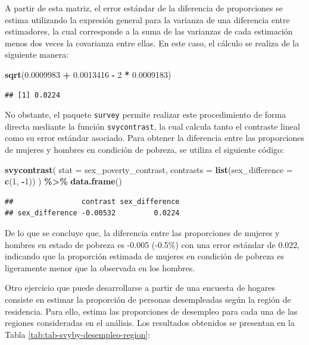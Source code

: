 \documentclass[
  spanish,
  12pt,
]{book}
\newenvironment{Shaded}{\begin{snugshade}}{\end{snugshade}}
\newcommand{\AttributeTok}[1]{\textcolor[rgb]{0.13,0.29,0.53}{#1}}
\newcommand{\DecValTok}[1]{\textcolor[rgb]{0.00,0.00,0.81}{#1}}
\newcommand{\FloatTok}[1]{\textcolor[rgb]{0.00,0.00,0.81}{#1}}
\newcommand{\FunctionTok}[1]{\textcolor[rgb]{0.13,0.29,0.53}{\textbf{#1}}}
\newcommand{\NormalTok}[1]{#1}
\newcommand{\SpecialCharTok}[1]{\textcolor[rgb]{0.81,0.36,0.00}{\textbf{#1}}}
\begin{document}
A partir de esta matriz, el error estándar de la diferencia de proporciones se estima utilizando la expresión general para la varianza de una diferencia entre estimadores, la cual corresponde a la suma de las varianzas de cada estimación menos dos veces la covarianza entre ellas. En este caso, el cálculo se realiza de la siguiente manera:

\begin{Shaded}
\begin{Highlighting}[]
\FunctionTok{sqrt}\NormalTok{(}\FloatTok{0.0009983} \SpecialCharTok{+} \FloatTok{0.0013416} \SpecialCharTok{{-}} \DecValTok{2} \SpecialCharTok{*} \FloatTok{0.0009183}\NormalTok{)}
\end{Highlighting}
\end{Shaded}

\begin{verbatim}
## [1] 0.0224
\end{verbatim}

No obstante, el paquete \texttt{survey} permite realizar este procedimiento de forma directa mediante la función \texttt{svycontrast}, la cual calcula tanto el contraste lineal como su error estándar asociado. Para obtener la diferencia entre las proporciones de mujeres y hombres en condición de pobreza, se utiliza el siguiente código:

\begin{Shaded}
\begin{Highlighting}[]
\FunctionTok{svycontrast}\NormalTok{(}
  \AttributeTok{stat =}\NormalTok{ sex\_poverty\_contrast,}
  \AttributeTok{contrasts =} \FunctionTok{list}\NormalTok{(}\AttributeTok{sex\_difference =} \FunctionTok{c}\NormalTok{(}\DecValTok{1}\NormalTok{, }\SpecialCharTok{{-}}\DecValTok{1}\NormalTok{))}
\NormalTok{) }\SpecialCharTok{\%\textgreater{}\%}
  \FunctionTok{data.frame}\NormalTok{()}
\end{Highlighting}
\end{Shaded}

\begin{verbatim}
##                contrast sex_difference
## sex_difference -0.00532         0.0224
\end{verbatim}

De lo que se concluye que, la diferencia entre las proporciones de mujeres y hombres en estado de pobreza es -0.005 (-0.5\%) con una error estándar de 0.022, indicando que la proporción estimada de mujeres en condición de pobreza es ligeramente menor que la observada en los hombres.

Otro ejercicio que puede desarrollarse a partir de una encuesta de hogares consiste en estimar la proporción de personas desempleadas según la región de residencia. Para ello, estima las proporciones de desempleo para cada una de las regiones consideradas en el análisis. Los resultados obtenidos se presentan en la Tabla \ref{tab:tab-svyby-desempleo-region}:
\end{document}
